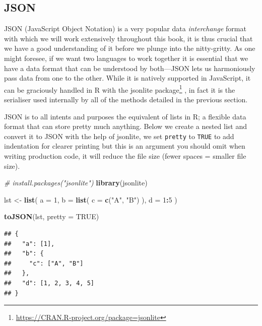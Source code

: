 \documentclass[
]{krantz}
\makeatletter
\newenvironment{Shaded}{\begin{snugshade}}{\end{snugshade}}
\newcommand{\CommentTok}[1]{\textcolor[rgb]{0.37,0.37,0.37}{\textit{#1}}}
\newcommand{\DataTypeTok}[1]{\textcolor[rgb]{0.27,0.27,0.27}{#1}}
\newcommand{\DecValTok}[1]{\textcolor[rgb]{0.06,0.06,0.06}{#1}}
\newcommand{\KeywordTok}[1]{\textcolor[rgb]{0.27,0.27,0.27}{\textbf{#1}}}
\newcommand{\NormalTok}[1]{#1}
\newcommand{\OperatorTok}[1]{\textcolor[rgb]{0.43,0.43,0.43}{\textbf{#1}}}
\newcommand{\OtherTok}[1]{\textcolor[rgb]{0.37,0.37,0.37}{#1}}
\newcommand{\StringTok}[1]{\textcolor[rgb]{0.5,0.5,0.5}{#1}}
\renewcommand{\href}[2]{#2\footnote{\url{#1}}}
\newenvironment{kframe}{%
\medskip{}
\setlength{\fboxsep}{.8em}
 \def\at@end@of@kframe{}%
 \ifinner\ifhmode%
  \def\at@end@of@kframe{\end{minipage}}%
  \begin{minipage}{\columnwidth}%
 \fi\fi%
 \def\FrameCommand##1{\hskip\@totalleftmargin \hskip-\fboxsep
 \colorbox{shadecolor}{##1}\hskip-\fboxsep
     \hskip-\linewidth \hskip-\@totalleftmargin \hskip\columnwidth}%
 \MakeFramed {\advance\hsize-\width
   \@totalleftmargin\z@ \linewidth\hsize
   \@setminipage}}%
 {\par\unskip\endMakeFramed%
 \at@end@of@kframe}
\renewenvironment{Shaded}{\begin{kframe}}{\end{kframe}}
\makeatother
\begin{document}
\hypertarget{json}{%
\subsection*{JSON}\label{json}}


JSON (JavaScript Object Notation) is a very popular data \emph{interchange} format with which we will work extensively throughout this book, it is thus crucial that we have a good understanding of it before we plunge into the nitty-gritty. As one might foresee, if we want two languages to work together it is essential that we have a data format that can be understood by both---JSON lets us harmoniously pass data from one to the other. While it is natively supported in JavaScript, it can be graciously handled in R with the \href{https://CRAN.R-project.org/package=jsonlite}{jsonlite package} \citep{R-jsonlite}, in fact it is the serialiser used internally by all of the methods detailed in the previous section.

JSON is to all intents and purposes the equivalent of lists in R; a flexible data format that can store pretty much anything. Below we create a nested list and convert it to JSON with the help of jsonlite, we set \texttt{pretty} to \texttt{TRUE} to add indentation for clearer printing but this is an argument you should omit when writing production code, it will reduce the file size (fewer spaces = smaller file size).

\begin{Shaded}
\begin{Highlighting}[]
\CommentTok{\# install.packages("jsonlite")}
\KeywordTok{library}\NormalTok{(jsonlite)}

\NormalTok{lst <{-}}\StringTok{ }\KeywordTok{list}\NormalTok{(}
  \DataTypeTok{a =} \DecValTok{1}\NormalTok{,}
  \DataTypeTok{b =} \KeywordTok{list}\NormalTok{(}
    \DataTypeTok{c =} \KeywordTok{c}\NormalTok{(}\StringTok{"A"}\NormalTok{, }\StringTok{"B"}\NormalTok{)}
\NormalTok{  ),}
  \DataTypeTok{d =} \DecValTok{1}\OperatorTok{:}\DecValTok{5}
\NormalTok{)}

\KeywordTok{toJSON}\NormalTok{(lst, }\DataTypeTok{pretty =} \OtherTok{TRUE}\NormalTok{)}
\end{Highlighting}
\end{Shaded}

\begin{verbatim}
## {
##   "a": [1],
##   "b": {
##     "c": ["A", "B"]
##   },
##   "d": [1, 2, 3, 4, 5]
## }
\end{verbatim}
\end{document}
